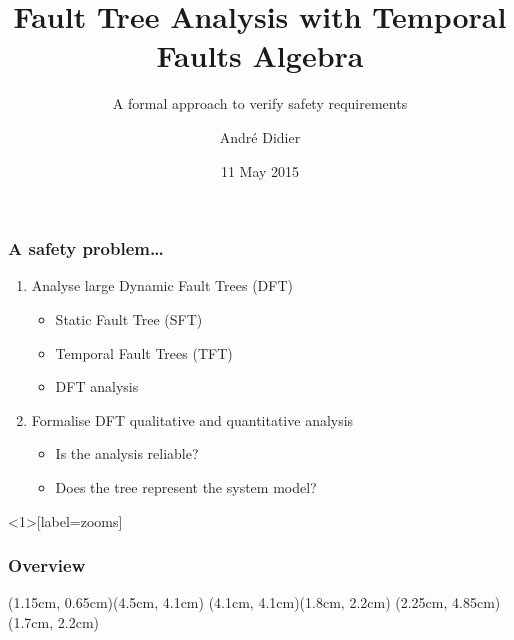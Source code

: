 \documentclass{beamer}
\title{Fault Tree Analysis with Temporal Faults Algebra}
\subtitle{A formal approach to verify safety requirements}
\author{André Didier}
\date{11 May 2015}
\begin{document}
\begin{frame}
\titlepage
\end{frame}

\begin{frame}
\frametitle{A safety problem\ldots}
\begin{enumerate}
  \item Analyse \alert<4>{large} Dynamic Fault Trees (DFT)\\
    \begin{minipage}[c]{4.60cm}
        \begin{itemize}
          \item Static Fault Tree (SFT) 
          \item Temporal Fault Trees (TFT)
          \item DFT analysis 
        \end{itemize}
    \end{minipage}
    \begin{minipage}[c]{5.3cm}
    \end{minipage}
  \item Formalise DFT qualitative and quantitative analysis
    \begin{itemize}
      \item<3-> Is the analysis reliable?
      \item<3-> Does the tree represent the system model?
    \end{itemize}
\end{enumerate}
\end{frame}

\begin{frame}<1>[label=zooms]
\frametitle<1>{Overview}
(1.15cm, 0.65cm)(4.5cm, 4.1cm)
(4.1cm, 4.1cm)(1.8cm, 2.2cm)
(2.25cm, 4.85cm)(1.7cm, 2.2cm)
\end{frame}
\end{document}

